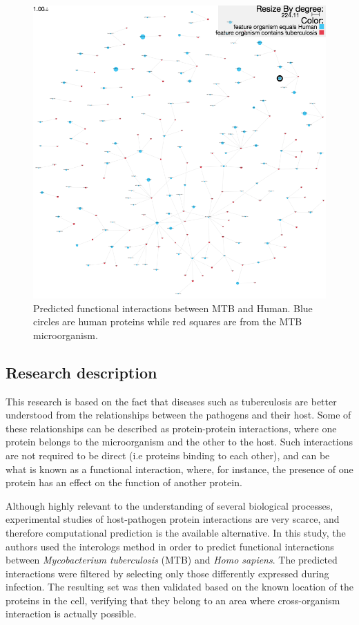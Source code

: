 \begin{figure}
\centering
\includegraphics[width=\textwidth]{figures/pinv_human_mtb.png}
\caption[Predicted functional interactions between MTB and Human]{Predicted functional interactions between MTB and Human. Blue circles are human proteins while red squares are from the MTB microorganism.
\label{fig:pinv_human_mtb}}
\end{figure}

\subsection{Research description}
This research is based on the fact that diseases such as tuberculosis are better understood from the relationships between the pathogens and their host. Some of these relationships can be described as protein-protein interactions, where one protein belongs to the microorganism and the other to the host. Such interactions are not required to be direct (i.e proteins binding to each other), and can be what is known as a functional interaction, where, for instance,  the presence of one protein has an effect on the function of another protein. 

Although highly relevant to the understanding of several biological processes, experimental studies of host-pathogen protein interactions are very scarce, and therefore computational prediction is the available alternative. In this study, the authors used the interologs method in order to predict functional interactions between \emph{Mycobacterium tuberculosis} (MTB) and \emph{Homo sapiens}. The predicted interactions were filtered by selecting only those differently expressed during infection. The resulting set was then validated based on the known location of the proteins in the cell, verifying that they belong to an area where cross-organism interaction is actually possible. 

